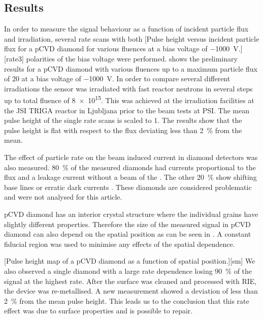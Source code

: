 \subsection{Results}
In order to measure the signal behaviour as a function of incident particle flux and irradiation, several rate scans with both 
[Pulse height versus incident particle flux for a \ac{pCVD} diamond for various fluences at a bias voltage of \SI{-1000}{\volt}.][rate3]
polarities of the bias voltage were performed.  shows the preliminary results for a \ac{pCVD} diamond with 
various fluences up to a maximum particle flux of \SI{20}{\mhzcm} at a bias voltage of \SI{-1000}{\volt}. In order to compare several different irradiations the sensor was irradiated with fast reactor neutrons in several steps up to total fluence of \SI{8e15}{\ncm}. This was achieved at the irradiation facilities at the JSI TRIGA reactor in Ljubljana \cite{irrad} prior to the beam tests at \ac{PSI}. The mean pulse height of the single rate scans is scaled to 1. The results show that the pulse height is flat with respect to the flux deviating less than \SI{2}{\%} from the mean.\par 
The effect of particle rate on the beam induced current in diamond detectors was also measured. \SI{80}{\%} of the measured diamonds had currents proportional to the flux and a leakage current without a beam of the . The other \SI{20}{\%} show shifting base lines or erratic dark currents \cite{erratic}. These diamonds are considered problematic and were not analysed for this article.\par
\ac{pCVD} diamond has an interior crystal structure where the individual grains have slightly different properties. Therefore the size of the measured signal in \ac{pCVD} diamond can also depend on the spatial position as can be seen in . A constant fiducial region was used to minimise any effects of the spatial dependence. \par %
{}[Pulse height map of a \ac{pCVD} diamond as a function of spatial position.][sm]
We also observed a single diamond with a large rate dependence losing \SI{90}{\%} of the signal at the highest rate. After the surface was cleaned and processed with \ac{RIE}, the device was re-metallised. A new measurement showed a deviation of less than \SI{2}{\%} from the mean pulse height. This leads us to the conclusion that this rate effect was due to surface properties and is possible to repair.

